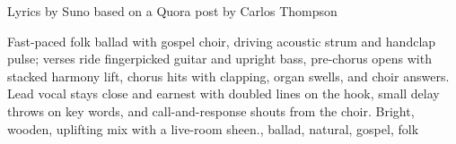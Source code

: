 

\begin{notes}
Lyrics by Suno based on a Quora post by Carlos Thompson
\end{notes}
\begin{style}
Fast-paced folk ballad with gospel choir, driving acoustic strum and handclap pulse; verses ride fingerpicked guitar and upright bass, pre-chorus opens with stacked harmony lift, chorus hits with clapping, organ swells, and choir answers. %
Lead vocal stays close and earnest with doubled lines on the hook, small delay throws on key words, and call-and-response shouts from the choir. %
Bright, wooden, uplifting mix with a live-room sheen., ballad, natural, gospel, folk
\end{style}
